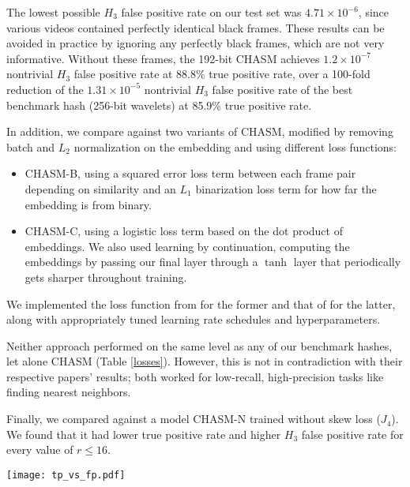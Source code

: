 \documentclass{article}
\renewenvironment{figure}{\par\medskip\noindent\minipage{\linewidth}}{\endminipage\par\medskip}
\begin{document}
\begin{multicols}{2}
The lowest possible $H_3$ false positive rate on our test set was $4.71\times10^{-6}$, since various videos contained perfectly identical black frames.
These results can be avoided in practice by ignoring any perfectly black frames, which are not very informative.
Without these frames, the 192-bit CHASM achieves $1.2\times10^{-7}$ nontrivial $H_3$ false positive rate at 88.8\% true positive rate, over a 100-fold reduction of the $1.31\times10^{-5}$ nontrivial $H_3$ false positive rate of the best benchmark hash (256-bit wavelets) at 85.9\% true positive rate.

In addition, we compare against two variants of CHASM, modified by removing batch and $L_2$ normalization on the embedding and using different loss functions:
\begin{itemize}
\item CHASM-B, using a squared error loss term between each frame pair depending on similarity and an $L_1$ binarization loss term for how far the embedding is from binary.
\item CHASM-C, using a logistic loss term based on the dot product of embeddings. We also used learning by continuation, computing the embeddings by passing our final layer through a $\tanh$ layer that periodically gets sharper throughout training.
\end{itemize}
We implemented the loss function from \cite{supervised16} for the former and that of \cite{hashnet17} for the latter, along with appropriately tuned learning rate schedules and hyperparameters.

Neither approach performed on the same level as any of our benchmark hashes, let alone CHASM (Table \ref{losses}).
However, this is not in contradiction with their respective papers' results; both worked for low-recall, high-precision tasks like finding nearest neighbors.

Finally, we compared against a model CHASM-N trained without skew loss ($J_4$). We found that it had lower true positive rate and higher $H_3$ false positive rate for every value of $r \le 16$.

\begin{figure}
\texttt{[image: tp\_vs\_fp.pdf]}
\label{roc}
\end{figure}



\end{multicols}
\end{document}

